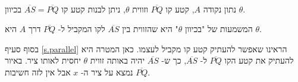 \begin{theorem}\label{thm.angle}\mbox{}\\
נתון נקודה
$A$,
קטע קו
$\overline{PQ}$
וזווית
$\theta$,
ניתן לבנות קטע קו
$\overline{AS}=\overline{PQ}$
בכיוון 
$\theta$.
\end{theorem}
\begin{center}

\vspace*{-8pt}
\end{center}
המשמעות של "בכיוון 
$\theta$"
היא שהזווית בין 
$\overline{AS}$
לקו המקביל ל-%
$\overline{PQ}$
דרך
$A$
היא
$\theta$.

בסוף סעיף
\ref{s.parallel}
הראינו שאפשר להעתיק קטע קו מקביל לעצמו. כאן המטרה היא להעתיק את קטע הקו
$\overline{PQ}$
ל-%
$\overline{AS}$,
כך ש-%
$\overline{AS}$
יהיה באותה זווית
$\theta$
יחסית לאותו ציר. באיור
$\overline{PQ}$
נמצא על ציר ה-%
$x$
אבל אין לזה חשיבות.


